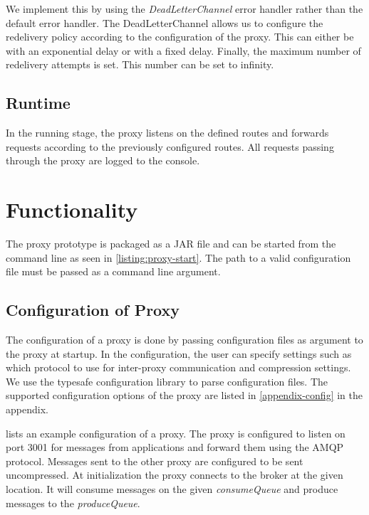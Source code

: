 We implement this by using the \textit{DeadLetterChannel} error handler rather
than the default error handler. The DeadLetterChannel allows us to configure the
redelivery policy according to the configuration of the proxy. This can either
be with an exponential delay or with a fixed delay. Finally, the maximum number
of redelivery attempts is set. This number can be set to infinity.

\subsection{Runtime}

In the running stage, the proxy listens on the defined routes and forwards
 requests according to the previously configured routes. All requests passing
 through the proxy are logged to the console.


\section{Functionality}

The proxy prototype is packaged as a JAR file and can be started from the command
line as seen in \cref{listing:proxy-start}. The path to a valid configuration
file must be passed as a command line argument.



\subsection{Configuration of Proxy}
\label{section:proxy-config}

The configuration of a proxy is done by passing configuration files as argument
to the proxy at startup. In the configuration, the user can specify settings
such as which protocol to use for inter-proxy communication and compression
settings. We use the typesafe\cite{typesafe-homepage} configuration library to
parse configuration files. The supported configuration options of the proxy are
listed in \cref{appendix-config} in the appendix.

 lists an example configuration of a proxy. The proxy
is configured to listen on port 3001 for messages from applications and forward
them using the AMQP protocol. Messages sent to the other proxy are configured to
be sent uncompressed. At initialization the proxy connects to the broker at the
given location. It will consume messages on the given \textit{consumeQueue} and
produce messages to the \textit{produceQueue}.


